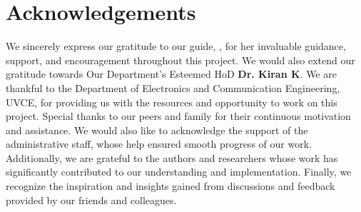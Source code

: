 \chapter*{Acknowledgements}
\addborder
\vspace{10mm}

 We sincerely express our gratitude to our guide, \textbf{\guideA}, for her invaluable guidance, support, and encouragement throughout this project. We would also extend our gratitude towards Our Department's Esteemed HoD \textbf{Dr. Kiran K}. We are thankful to the Department of Electronics and Communication Engineering, UVCE, for providing us with the resources and opportunity to work on this project. Special thanks to our peers and family for their continuous motivation and assistance. We would also like to acknowledge the support of the administrative staff, whose help ensured smooth progress of our work. Additionally, we are grateful to the authors and researchers whose work has significantly contributed to our understanding and implementation. Finally, we recognize the inspiration and insights gained from discussions and feedback provided by our friends and colleagues. 

